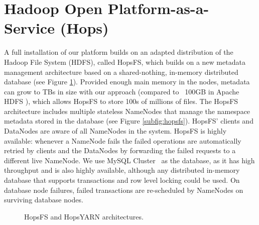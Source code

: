 \section{Hadoop Open Platform-as-a-Service (Hops)}
\label{hops}

A full installation of our platform builds on an adapted distribution of the Hadoop File System (HDFS), called HopsFS, which builds on a new metadata management architecture based on a shared-nothing, in-memory distributed database (see Figure \ref{fig:hops}). Provided enough main memory in the nodes, metadata can  grow to TBs in size with our approach (compared to  ~100GB in Apache HDFS \cite{shvachko2010Hdfs}), which allows HopsFS to store 100s of millions of files. The HopsFS architecture includes multiple stateless NameNodes that manage the namespace metadata stored in the database (see Figure \ref{subfig:hopsfs}). HopsFS' clients and DataNodes are aware of all NameNodes in the system. HopsFS is  highly available: whenever a NameNode fails the failed operations are automatically retried by clients and the DataNodes by forwarding the failed requests to a different live NameNode. We use MySQL Cluster~\cite{ronstrom2005recovery} as the database, as it has high throughput and is also highly available, although any distributed in-memory database that supports transactions and row level locking could be used. On database node failures, failed transactions are re-scheduled by NameNodes on surviving database nodes.

\begin{figure}[!ht]
    \hfill
    \caption{HopsFS and HopsYARN architectures.}
    \label{fig:hops}
\end{figure}
 
